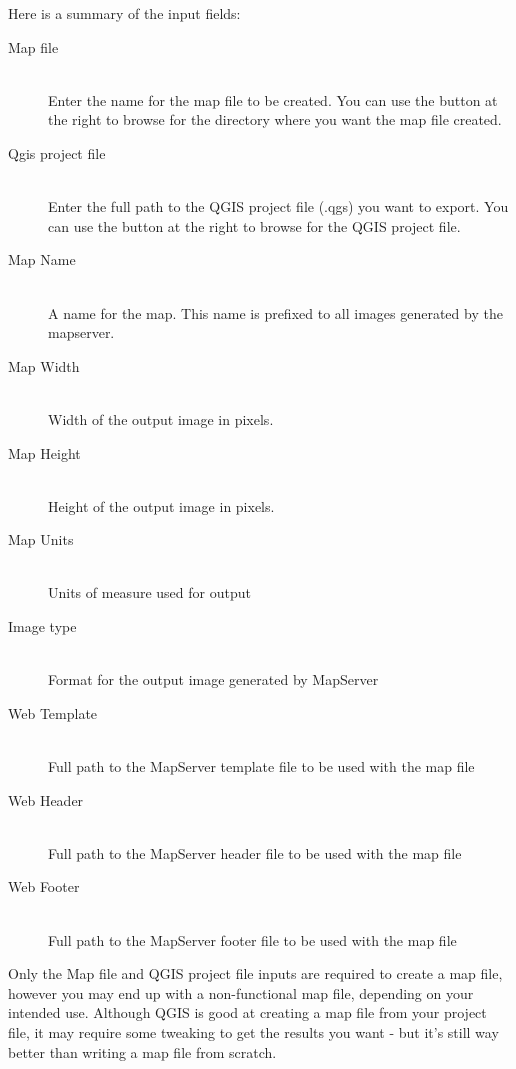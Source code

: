 Here is a summary of the input fields:

\begin{description}
\item [Map file] \mbox{}\\
Enter the name for the map file to be created. You can use the button at the right to browse for the directory where you want the map file created. 

\item [Qgis project file] \mbox{}\\
Enter the full path to the QGIS project file (.qgs) you want to export. You can use the button at the right to browse for the QGIS project file.
\item [Map Name] \mbox{}\\
A name for the map. This name is prefixed to all images generated by the mapserver.
\item [Map Width] \mbox{}\\
Width of the output image in pixels.

\item [Map Height] \mbox{}\\
Height of the output image in pixels.
\item [Map Units] \mbox{}\\
Units of measure used for output
\item [Image type] \mbox{}\\
Format for the output image generated by MapServer
\item [Web Template] \mbox{}\\
Full path to the MapServer template file to be used with the map file
\item [Web Header] \mbox{}\\
Full path to the MapServer header file to be used with the map file
\item [Web Footer] \mbox{}\\
Full path to the MapServer footer file to be used with the map file
\end{description}

Only the Map file and QGIS project file inputs are required to create a
map file, however you may end up with a non-functional map file, depending
on your intended use. Although QGIS is good at creating a map file from
your project file, it may require some tweaking to get the results you
want - but it's still way better than writing a map file from scratch.  



